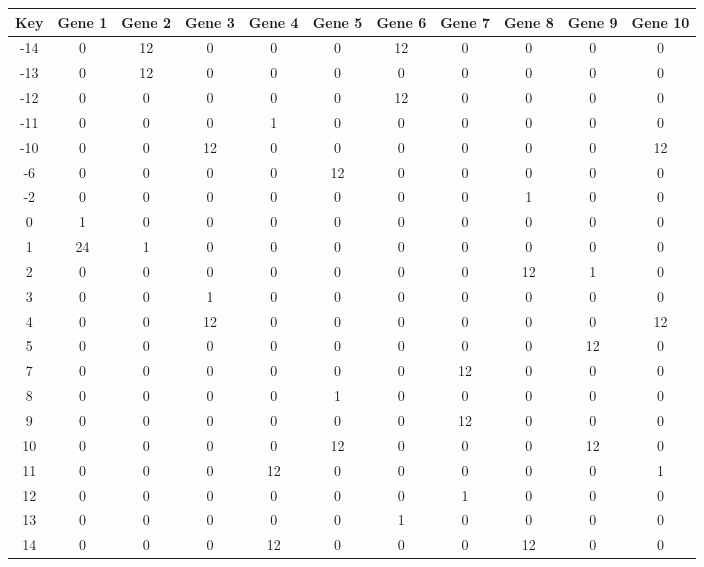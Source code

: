 \begin{tabular}{|c|c|c|c|c|c|c|c|c|c|c|}
\hline
Key & Gene 1 & Gene 2 & Gene 3 & Gene 4 & Gene 5 & Gene 6 & Gene 7 & Gene 8 & Gene 9 & Gene 10 \\
\hline
-14 & 0 & 12 & 0 & 0 & 0 & 12 & 0 & 0 & 0 & 0 \\
-13 & 0 & 12 & 0 & 0 & 0 & 0 & 0 & 0 & 0 & 0 \\
-12 & 0 & 0 & 0 & 0 & 0 & 12 & 0 & 0 & 0 & 0 \\
-11 & 0 & 0 & 0 & 1 & 0 & 0 & 0 & 0 & 0 & 0 \\
-10 & 0 & 0 & 12 & 0 & 0 & 0 & 0 & 0 & 0 & 12 \\
-6 & 0 & 0 & 0 & 0 & 12 & 0 & 0 & 0 & 0 & 0 \\
-2 & 0 & 0 & 0 & 0 & 0 & 0 & 0 & 1 & 0 & 0 \\
0 & 1 & 0 & 0 & 0 & 0 & 0 & 0 & 0 & 0 & 0 \\
1 & 24 & 1 & 0 & 0 & 0 & 0 & 0 & 0 & 0 & 0 \\
2 & 0 & 0 & 0 & 0 & 0 & 0 & 0 & 12 & 1 & 0 \\
3 & 0 & 0 & 1 & 0 & 0 & 0 & 0 & 0 & 0 & 0 \\
4 & 0 & 0 & 12 & 0 & 0 & 0 & 0 & 0 & 0 & 12 \\
5 & 0 & 0 & 0 & 0 & 0 & 0 & 0 & 0 & 12 & 0 \\
7 & 0 & 0 & 0 & 0 & 0 & 0 & 12 & 0 & 0 & 0 \\
8 & 0 & 0 & 0 & 0 & 1 & 0 & 0 & 0 & 0 & 0 \\
9 & 0 & 0 & 0 & 0 & 0 & 0 & 12 & 0 & 0 & 0 \\
10 & 0 & 0 & 0 & 0 & 12 & 0 & 0 & 0 & 12 & 0 \\
11 & 0 & 0 & 0 & 12 & 0 & 0 & 0 & 0 & 0 & 1 \\
12 & 0 & 0 & 0 & 0 & 0 & 0 & 1 & 0 & 0 & 0 \\
13 & 0 & 0 & 0 & 0 & 0 & 1 & 0 & 0 & 0 & 0 \\
14 & 0 & 0 & 0 & 12 & 0 & 0 & 0 & 12 & 0 & 0 \\
\hline
\end{tabular}
